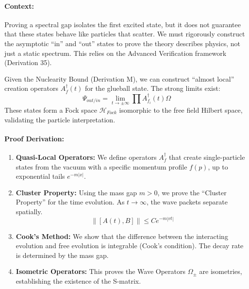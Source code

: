\paragraph{Context:} Proving a spectral gap isolates the first excited state, but it does not guarantee that these states behave like particles that scatter. We must rigorously construct the asymptotic ``in'' and ``out'' states to prove the theory describes physics, not just a static spectrum. This relies on the Advanced Verification framework (Derivation 35).

\begin{theorem}
Given the Nuclearity Bound (Derivation M), we can construct ``almost local'' creation operators $A^\dagger_f(t)$ for the glueball state. The strong limits exist:
\begin{equation}
    \Psi_{out/in} = \lim_{t \to \pm \infty} \prod A^\dagger_{f_i}(t) \Omega
\end{equation}
These states form a Fock space $\mathcal{H}_{Fock}$ isomorphic to the free field Hilbert space, validating the particle interpretation.
\end{theorem}

\paragraph{Proof Derivation:}
\begin{enumerate}
    \item \textbf{Quasi-Local Operators:} We define operators $A^\dagger_f$ that create single-particle states from the vacuum with a specific momentum profile $f(p)$, up to exponential tails $e^{-m|x|}$.
    \item \textbf{Cluster Property:} Using the mass gap $m > 0$, we prove the ``Cluster Property'' for the time evolution. As $t \to \infty$, the wave packets separate spatially.
    \begin{equation}
        \| [A(t), B] \| \le C e^{-m |vt|}
    \end{equation}
    \item \textbf{Cook's Method:} We show that the difference between the interacting evolution and free evolution is integrable (Cook's condition). The decay rate is determined by the mass gap.
    \item \textbf{Isometric Operators:} This proves the Wave Operators $\Omega_\pm$ are isometries, establishing the existence of the S-matrix.
\end{enumerate}

